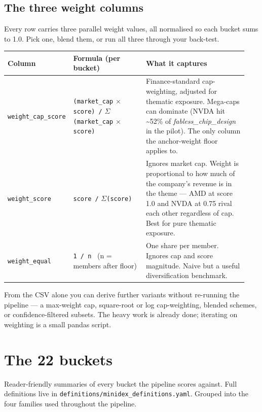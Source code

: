 \documentclass[11pt,a4paper,oneside]{article}
\begin{document}
\subsection*{The three weight columns}

Every row carries three parallel weight values, all normalised so each bucket sums to 1.0. Pick one, blend them, or run all three through your back-test.

\begin{center}
\begin{tabular}{@{}p{0.22\linewidth} p{0.30\linewidth} p{0.42\linewidth}@{}}
\toprule
\textbf{Column} & \textbf{Formula (per bucket)} & \textbf{What it captures} \\
\midrule
\texttt{weight\_cap\_score} & \texttt{(market\_cap} \(\times\) \texttt{score) /} \(\Sigma\)\texttt{(market\_cap} \(\times\) \texttt{score)} & Finance-standard cap-weighting, adjusted for thematic exposure. Mega-caps can dominate (NVDA hit \textasciitilde 52\% of \emph{fabless\_chip\_design} in the pilot). The only column the anchor-weight floor applies to. \\
\texttt{weight\_score} & \texttt{score /} \(\Sigma\)\texttt{(score)} & Ignores market cap. Weight is proportional to how much of the company's revenue is in the theme --- AMD at score 1.0 and NVDA at 0.75 rival each other regardless of cap. Best for pure thematic exposure. \\
\texttt{weight\_equal} & \texttt{1 / n}~ (n = members after floor) & One share per member. Ignores cap and score magnitude. Naive but a useful diversification benchmark. \\
\bottomrule
\end{tabular}
\end{center}

From the CSV alone you can derive further variants without re-running the pipeline --- a max-weight cap, square-root or log cap-weighting, blended schemes, or confidence-filtered subsets. The heavy work is already done; iterating on weighting is a small pandas script.

\section{The 22 buckets}

Reader-friendly summaries of every bucket the pipeline scores against. Full definitions live in \texttt{definitions/minidex\_definitions.yaml}. Grouped into the four families used throughout the pipeline.
\end{document}
